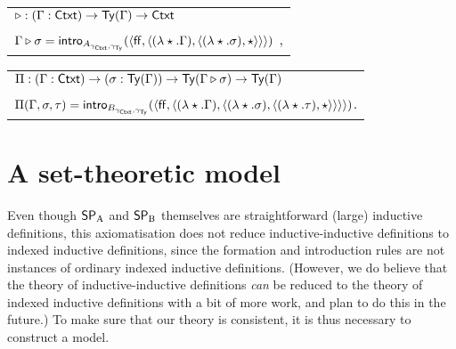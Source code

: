 \documentclass{article}
\begin{document}
\begin{description}
\begin{tabular}{l}
  $\triangleright : (\Gamma : \mathsf{Ctxt}) \to \mathsf{Ty}(\Gamma) \to \mathsf{Ctxt}$ \\
  $\Gamma \triangleright \sigma = \mathsf{intro}_{A_{\gamma_{\mathsf{Ctxt}}, \gamma_{\mathsf{Ty}}}}(\langle \mathsf{ff}, \langle (\lambda \star.\Gamma), \langle (\lambda \star.\sigma), \star\rangle \rangle\rangle)$ \enspace ,\\
\end{tabular}
\vskip 0.2cm
\begin{tabular}{l}
$\Pi : (\Gamma : \mathsf{Ctxt}) \to (\sigma : \mathsf{Ty}(\Gamma)) \to \mathsf{Ty}(\Gamma \triangleright \sigma) \to
\mathsf{Ty}(\Gamma)$ \\
$\Pi(\Gamma, \sigma, \tau) = \mathsf{intro}_{B_{\gamma_{\mathsf{Ctxt}}, \gamma_{\mathsf{Ty}}}}(\langle \mathsf{ff}, \langle (\lambda
    \star.\Gamma), \langle (\lambda \star.\sigma),\langle (\lambda \star. \tau) , \star\rangle\rangle \rangle\rangle)$\enspace .
\end{tabular}











\end{description}

\section{A set-theoretic model}
\label{sec:model}

Even though $\mathsf{SP}_{\mathrm{A}}$ and $\mathsf{SP}_{\mathrm{B}}$ themselves are straightforward (large)
inductive definitions, this axiomatisation does not reduce
inductive-inductive definitions to indexed inductive definitions,
since the formation and introduction rules are not instances of
ordinary indexed inductive definitions.  (However, we do believe that
the theory of inductive-inductive definitions \emph{can} be reduced to
the theory of indexed inductive definitions with a bit of more
work, and plan to do this in the future.) %
To make sure that our theory is consistent, it is thus necessary to
construct a model.
\end{document}
